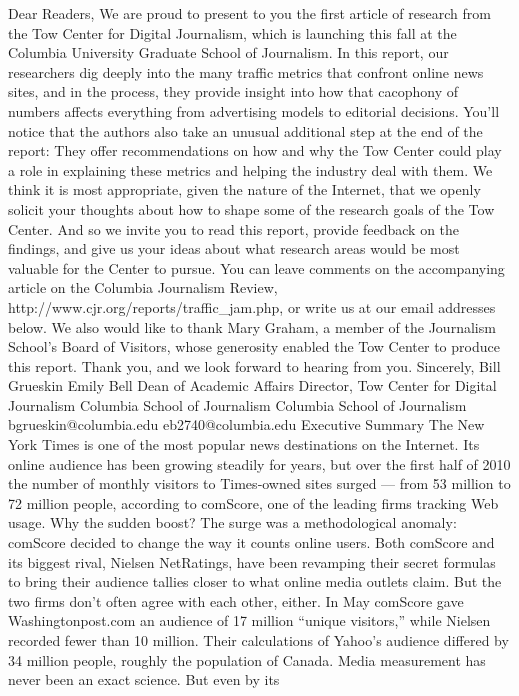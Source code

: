 Dear Readers,
We are proud to present to you the first article of research from the Tow Center
for Digital Journalism, which is launching this fall at the Columbia University
Graduate School of Journalism.
In this report, our researchers dig deeply into the many traffic metrics that
confront online news sites, and in the process, they provide insight into how that
cacophony of numbers affects everything from advertising models to editorial
decisions.
You’ll notice that the authors also take an unusual additional step at the end of
the report: They offer recommendations on how and why the Tow Center could
play a role in explaining these metrics and helping the industry deal with them.
We think it is most appropriate, given the nature of the Internet, that we openly
solicit your thoughts about how to shape some of the research goals of the Tow
Center. And so we invite you to read this report, provide feedback on the
findings, and give us your ideas about what research areas would be most
valuable for the Center to pursue. You can leave comments on the accompanying
article on the Columbia Journalism Review, http://www.cjr.org/reports/traffic_jam.php, or write us at our email addresses below.
We also would like to thank Mary Graham, a member of the Journalism School’s
Board of Visitors, whose generosity enabled the Tow Center to produce this
report.
Thank you, and we look forward to hearing from you.
Sincerely,
Bill Grueskin Emily Bell
Dean of Academic Affairs Director, Tow Center for Digital Journalism
Columbia School of Journalism Columbia School of Journalism
bgrueskin@columbia.edu eb2740@columbia.edu
Executive Summary
The New York Times is one of the most popular news destinations on the
Internet. Its online audience has been growing steadily for years, but over
the first half of 2010 the number of monthly visitors to Times‐owned sites
surged — from 53 million to 72 million people, according to comScore,
one of the leading firms tracking Web usage.
Why the sudden boost? The surge was a methodological anomaly:
comScore decided to change the way it counts online users. Both
comScore and its biggest rival, Nielsen NetRatings, have been revamping
their secret formulas to bring their audience tallies closer to what online
media outlets claim. But the two firms don’t often agree with each other,
either. In May comScore gave Washingtonpost.com an audience of 17
million ``unique visitors,'' while Nielsen recorded fewer than 10 million.
Their calculations of Yahoo’s audience differed by 34 million people,
roughly the population of Canada.
Media measurement has never been an exact science. But even by its
